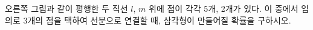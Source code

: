 \noindent\begin{minipage}[t]{0.58\linewidth}\vspace{0pt}\raggedright 오른쪽 그림과 같이 평행한 두 직선 $l$, $m$ 위에 점이 각각 5개, 2개가 있다. 이 중에서 임의로 3개의 점을 택하여 선분으로 연결할 때, 삼각형이 만들어질 확률을 구하시오.\end{minipage}\hfill\begin{minipage}[t]{0.4\linewidth}\vspace{0pt}\centering \resizebox{\ifdim\width>\linewidth\linewidth\else\width\fi}{!}{}\end{minipage}\par
